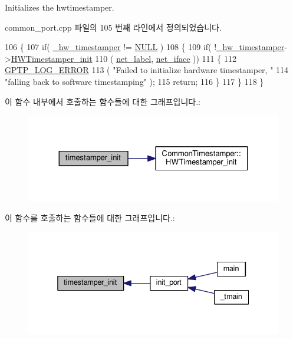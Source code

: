 Initializes the hwtimestamper. 



common\+\_\+port.\+cpp 파일의 105 번째 라인에서 정의되었습니다.


\begin{DoxyCode}
106 \{
107     \textcolor{keywordflow}{if}( \hyperlink{class_common_port_a6b964d49ce26b21cc984b14102973f87}{\_hw\_timestamper} != \hyperlink{openavb__types__base__pub_8h_a070d2ce7b6bb7e5c05602aa8c308d0c4}{NULL} )
108     \{
109         \textcolor{keywordflow}{if}( !\hyperlink{class_common_port_a6b964d49ce26b21cc984b14102973f87}{\_hw\_timestamper}->\hyperlink{class_common_timestamper_abde0de8253fd960807f7f2816c0c5225}{HWTimestamper\_init}
110             ( \hyperlink{class_common_port_a5885d7a835513edd0bbb0a170b4c9f01}{net\_label}, \hyperlink{class_common_port_a7bc95d8cb3e95a8e7f9c5dc261289e37}{net\_iface} ))
111         \{
112             \hyperlink{gptp__log_8hpp_afefbb1009717c128012bfeed94842987}{GPTP\_LOG\_ERROR}
113                 ( \textcolor{stringliteral}{"Failed to initialize hardware timestamper, "}
114                   \textcolor{stringliteral}{"falling back to software timestamping"} );
115             \textcolor{keywordflow}{return};
116         \}
117     \}
118 \}
\end{DoxyCode}


이 함수 내부에서 호출하는 함수들에 대한 그래프입니다.\+:
\nopagebreak
\begin{figure}[H]
\begin{center}
\leavevmode
\includegraphics[width=324pt]{class_common_port_a64530a2fb5ad64bdc7e61b2e37791191_cgraph}
\end{center}
\end{figure}




이 함수를 호출하는 함수들에 대한 그래프입니다.\+:
\nopagebreak
\begin{figure}[H]
\begin{center}
\leavevmode
\includegraphics[width=338pt]{class_common_port_a64530a2fb5ad64bdc7e61b2e37791191_icgraph}
\end{center}
\end{figure}


